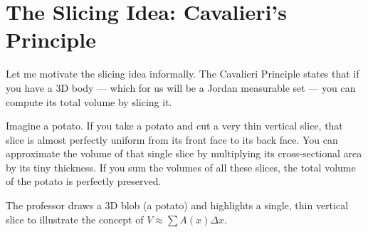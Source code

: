 \section{The Slicing Idea: Cavalieri's Principle}

\begin{spoken-clean}[00:40:07 - 00:42:00]
Let me motivate the slicing idea informally. The Cavalieri Principle states that if you have a 3D body — which for us will be a Jordan measurable set — you can compute its total volume by slicing it. 

Imagine a potato. If you take a potato and cut a very thin vertical slice, that slice is almost perfectly uniform from its front face to its back face. You can approximate the volume of that single slice by multiplying its cross-sectional area by its tiny thickness. If you sum the volumes of all these slices, the total volume of the potato is perfectly preserved.
\end{spoken-clean}

\begin{nice-box}
The professor draws a 3D blob (a potato) and highlights a single, thin vertical slice to illustrate the concept of $V \approx \sum A(x) \Delta x$.
\end{nice-box}

\begin{math-stroke}
\begin{center}
\end{center}
\end{math-stroke}


